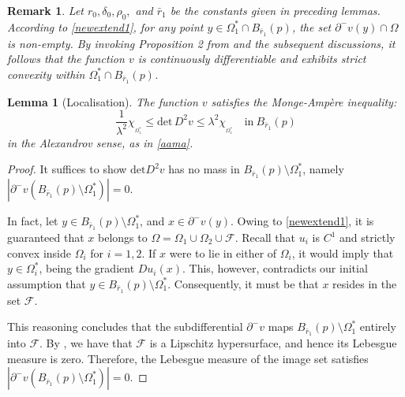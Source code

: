 \documentclass[11pt]{amsart}
\theoremstyle{plain}
\newtheorem{lemma}{Lemma}[section]
\newtheorem{remark}{Remark}[section]
\renewcommand{\det}{\mbox{det}}
\newcommand{\0}{\textbf{0}}
\numberwithin{equation}{section}
\numberwithin{equation}{section}
\numberwithin{figure}{section}
\begin{document}
\begin{remark}
\emph{ Let \( r_0, \delta_0, \rho_0, \) and \( \bar r_1 \) be the constants given in preceding lemmas. 
According to \eqref{newextend1}, for any point \( y \in \Omega_1^* \cap B_{\bar r_1}(p) \), the set \( \partial^{-}v(y) \cap \Omega \) is non-empty. By invoking Proposition 2 from \cite{FK1} and the subsequent discussions, it follows that the function \( v \) is continuously differentiable and exhibits strict convexity within \( \Omega_1^* \cap B_{\bar r_1}(p) \). }
\end{remark}


\begin{lemma}[Localisation]
The function $v$ satisfies the Monge-Amp\`ere inequality:
\begin{equation}\label{lockey1}
\frac{1}{\lambda^2}\chi_{_{\Omega^*_1}} \leq \det\, D^2v \leq \lambda^2\chi_{_{\Omega^*_1}} 
\quad \text{in} \ B_{\bar r_1}(p)
\end{equation}
in the Alexandrov sense, as in \eqref{aama}. 
\end{lemma}

\begin{proof}
It suffices to show $\det D^2v$ has no mass in $B_{\bar r_1}(p) \setminus \Omega_1^*$, namely $|\partial^{-}v(B_{\bar r_1}(p) \setminus \Omega_1^*)| =0$. 

In fact, let $ y\in B_{\bar r_1}(p) \setminus \Omega_1^*$, and $x\in \partial^{-}v(y)$. Owing to \eqref{newextend1}, it is guaranteed that \( x \) belongs to \( \Omega = \Omega_1 \cup \Omega_2 \cup \mathcal{F} \).
Recall that $u_i$ is $C^1$ and strictly convex inside $\Omega_i$ for $i=1, 2.$
 If \( x \) were to lie in either of \( \Omega_i \), it would imply that \( y \in\Omega_i^* \), being the gradient \( Du_i(x) \). This, however, contradicts our initial assumption that \( y \in B_{\bar r_1}(p) \setminus \Omega_1^* \). Consequently, it must be that \( x \) resides in the set \( \mathcal{F} \).

This reasoning concludes that the subdifferential \( \partial^{-}v \) maps \( B_{\bar r_1}(p) \setminus \Omega_1^* \) entirely into \( \mathcal{F} \). 
 By \cite[Theorem 5.1]{CL1}, we have that $\mathcal{F}$ is a Lipschitz hypersurface, and hence its Lebesgue measure is zero.
Therefore, the Lebesgue measure of the image set satisfies $|\partial^{-}v(B_{\bar r_1}(p) \setminus \Omega_1^*)| =0$.
\end{proof}
\end{document}
